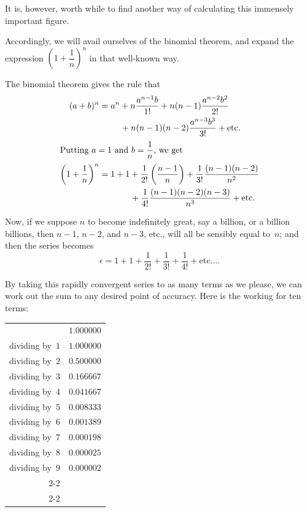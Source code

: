 \documentclass[12pt]{book}[2005/09/16]
\newcommand{\DPPageSep}[2]{\Pagelabel{#2}}
\newcommand{\Pagelabel}[1]
  {\phantomsection\label{#1}}
\begin{document}
It is, however, worth while to find another way of
calculating this immensely important figure.

Accordingly, we will avail ourselves of the binomial
theorem, and expand the expression $\left(1 + \dfrac{1}{n}\right)^n$ in that
well-known way.

The binomial theorem\Pagelabel{binomtheo} gives the rule that
\begin{align*}
(a + b)^n &= a^n + n \dfrac{a^{n-1} b}{1!} + n(n - 1) \dfrac{a^{n-2} b^2}{2!} \\
  & \phantom{= a^n\ } + n(n -1)(n - 2) \dfrac{a^{n-3} b^3}{3!} + \text{etc}. \\
\intertext{Putting $a = 1$ and $b = \dfrac{1}{n}$, we get}
\left(1 + \dfrac{1}{n}\right)^n
  &= 1 + 1 + \dfrac{1}{2!} \left(\dfrac{n - 1}{n}\right) + \dfrac{1}{3!} \dfrac{(n - 1)(n - 2)}{n^2} \\
  &\phantom{= 1 + 1\ } + \dfrac{1}{4!} \dfrac{(n - 1)(n - 2)(n - 3)}{n^3} + \text{etc}.
\end{align*}

Now, if we suppose $n$ to become indefinitely great,
say a billion, or a billion billions, then $n - 1$, $n - 2$,
and $n - 3$, etc., will all be sensibly equal to~$n$; and
then the series becomes
\[
\epsilon = 1 + 1 + \dfrac{1}{2!} + \dfrac{1}{3!} + \dfrac{1}{4!} + \text{etc}.\ldots
\]

By taking this rapidly convergent series to as
many terms as we please, we can work out the sum to
any desired point of accuracy. Here is the working
for ten terms:
\DPPageSep{154.png}{142}%
\begin{center}
\begin{tabular}{@{}r<{\qquad}@{}l@{}}
                & $1.000000$ \\
dividing by~$1$ & $1.000000$ \\
dividing by~$2$ & $0.500000$ \\
dividing by~$3$ & $0.166667$ \\
dividing by~$4$ & $0.041667$ \\
dividing by~$5$ & $0.008333$ \\
dividing by~$6$ & $0.001389$ \\
dividing by~$7$ & $0.000198$ \\
dividing by~$8$ & $0.000025$ \\
dividing by~$9$ & $0.000002$ \\
\cline{2-2}
\multicolumn{2}{r@{}}{Total\quad $2.718281$} \\
\cline{2-2}
\end{tabular}
\end{center}
\end{document}
